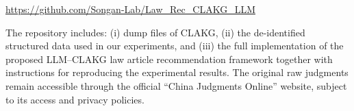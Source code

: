 \documentclass[review,times,nonatbib]{elsarticle} %
\renewcommand{\textcolor}[2]{#2}
\begin{document}
\begin{center}
\textcolor{blue}{\url{https://github.com/Songan-Lab/Law_Rec_CLAKG_LLM}}
\end{center}

\textcolor{blue}{The repository includes: (i) dump files of CLAKG, (ii) the de-identified structured data used in our experiments, and (iii) the full implementation of the proposed LLM--CLAKG law article recommendation framework together with instructions for reproducing the experimental results. The original raw judgments remain accessible through the official ``China Judgments Online'' website, subject to its access and privacy policies.}




\printbibliography
\end{document}
